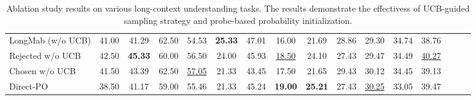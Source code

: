 \begin{table}[!t]
{\begin{tabular}{lccccccccccccccc}
    LongMab (w/o UCB)  & 41.00 & 41.29 & 62.50 & 54.53 & \textbf{25.33} & 47.01 & 16.00 & 21.69 & 28.86 & 29.30 & 34.74 & 38.76 \\
    Rejected w/o UCB & 42.50 & \textbf{45.33} & 60.00 & 56.50 & 24.00 & 45.93 & \underline{18.50} & 24.10 & 27.43 & 29.47 & 34.49 & \underline{40.27} \\
    Chosen w/o UCB & 41.50 & 43.39 & 62.50 & \underline{57.05} & 21.33 & 43.45 & 17.50 & 21.65 & 29.43 & 30.12 & 34.45 & 39.13 \\
    \hdashline
    Direct-PO & 38.50 & 41.17 & 59.00 & 55.46 & 21.33 & 45.24 & \textbf{19.00} & \textbf{25.21} & 27.43 & \underline{30.25} & 33.05 & 39.47 \\
    \hline
    \end{tabular}
}
\caption{Ablation study results on various long-context understanding tasks. The results demonstrate the effectivess of UCB-guided sampling strategy and probe-based probability initialization.}
\label{tab:ablation}
\end{table}


